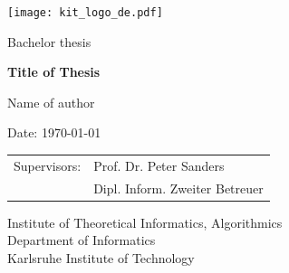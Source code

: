 \documentclass[a4paper,12pt,bibtotoc,titlepage, liststotoc,BCOR7mm,headsepline,pointlessnumbers]{scrbook}
\numberwithin{equation}{section}
\begin{document}



\pagestyle{empty} %
\renewcommand{\thepage}{\roman{page}}

\begin{titlepage}

  \begin{center}\large
  \begin{flushleft}
    \quad\texttt{[image: kit\_logo\_de.pdf]} \hfill
     
  \end{flushleft}

    \vfill
    \vfill
    \vfill
    \vfill

    Bachelor thesis
    \vspace*{2cm}

    {\bf\huge Title of Thesis  \par}

    \vfill

    Name of author

    \vspace*{15mm}

    Date: \today 

    \vspace*{40mm}
    \begin{tabular}{rl}
      Supervisors: & Prof. Dr. Peter Sanders \\
      & Dipl. Inform. Zweiter Betreuer \\
    \end{tabular}
    
    \vspace*{10mm}


    \vspace*{10mm}
     Institute of Theoretical Informatics, Algorithmics \\
     Department of Informatics \\
     Karlsruhe Institute of Technology

    \vspace*{12mm}
    \vfill
  \end{center}

\end{titlepage}
\end{document}
